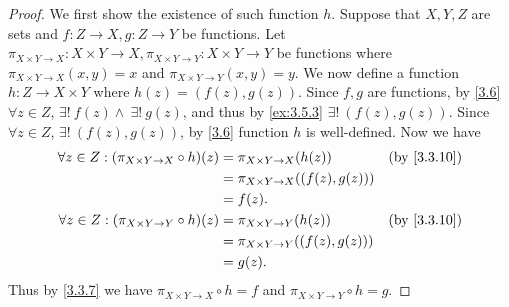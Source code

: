 \begin{proof}
  We first show the existence of such function \(h\).
  Suppose that \(X, Y, Z\) are sets and \(f : Z \to X, g : Z \to Y\) be functions.
  Let \(\pi_{X \times Y \to X} : X \times Y \to X, \pi_{X \times Y \to Y} : X \times Y \to Y\) be functions where \(\pi_{X \times Y \to X}(x, y) = x\) and \(\pi_{X \times Y \to Y}(x, y) = y\).
  We now define a function \(h : Z \to X \times Y\) where \(h(z) = (f(z), g(z))\).
  Since \(f, g\) are functions, by \cref{3.6} \(\forall z \in Z\), \(\exists!\ f(z) \land \ \exists!\ g(z)\), and thus by \cref{ex:3.5.3} \(\exists!\ (f(z), g(z))\).
  Since \(\forall z \in Z\), \(\exists!\ (f(z), g(z))\), by \cref{3.6} function \(h\) is well-defined.
  Now we have
  \begin{align*}
    \forall z \in Z : (\pi_{X \times Y \to X} \circ h)(z) & = \pi_{X \times Y \to X}(h(z))         & \text{(by \cref{3.3.10})} \\
                                                          & = \pi_{X \times Y \to X}((f(z), g(z)))                             \\
                                                          & = f(z).                                                            \\
    \forall z \in Z : (\pi_{X \times Y \to Y} \circ h)(z) & = \pi_{X \times Y \to Y}(h(z))         & \text{(by \cref{3.3.10})} \\
                                                          & = \pi_{X \times Y \to Y}((f(z), g(z)))                             \\
                                                          & = g(z).
  \end{align*}
  Thus by \cref{3.3.7} we have \(\pi_{X \times Y \to X} \circ h = f\) and \(\pi_{X \times Y \to Y} \circ h = g\).


\end{proof}
